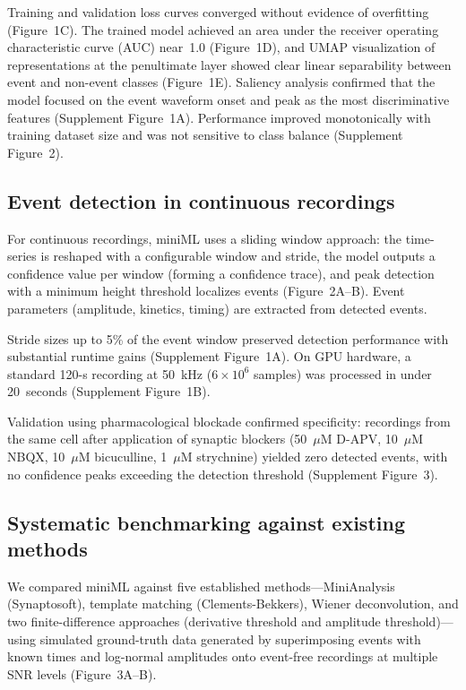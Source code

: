 \documentclass[11pt]{article}
\begin{document}
Training and validation loss curves converged without evidence of overfitting (Figure~1C). The trained model achieved an area under the receiver operating characteristic curve (AUC) near~1.0 (Figure~1D), and UMAP visualization of representations at the penultimate layer showed clear linear separability between event and non-event classes (Figure~1E). Saliency analysis confirmed that the model focused on the event waveform onset and peak as the most discriminative features (Supplement Figure~1A). Performance improved monotonically with training dataset size and was not sensitive to class balance (Supplement Figure~2).

\subsection{Event detection in continuous recordings}

For continuous recordings, miniML uses a sliding window approach: the time-series is reshaped with a configurable window and stride, the model outputs a confidence value per window (forming a confidence trace), and peak detection with a minimum height threshold localizes events (Figure~2A--B). Event parameters (amplitude, kinetics, timing) are extracted from detected events.

Stride sizes up to 5\% of the event window preserved detection performance with substantial runtime gains (Supplement Figure~1A). On GPU hardware, a standard 120-s recording at 50~kHz ($6 \times 10^6$ samples) was processed in under 20~seconds (Supplement Figure~1B).

Validation using pharmacological blockade confirmed specificity: recordings from the same cell after application of synaptic blockers (50~$\mu$M D-APV, 10~$\mu$M NBQX, 10~$\mu$M bicuculline, 1~$\mu$M strychnine) yielded zero detected events, with no confidence peaks exceeding the detection threshold (Supplement Figure~3).

\subsection{Systematic benchmarking against existing methods}

We compared miniML against five established methods---MiniAnalysis (Synaptosoft), template matching (Clements-Bekkers), Wiener deconvolution, and two finite-difference approaches (derivative threshold and amplitude threshold)---using simulated ground-truth data generated by superimposing events with known times and log-normal amplitudes onto event-free recordings at multiple SNR levels (Figure~3A--B).
\end{document}
